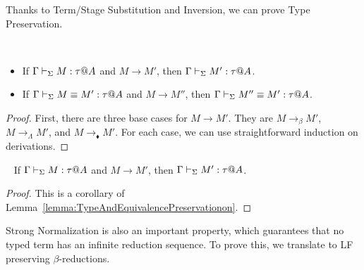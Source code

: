 
Thanks to Term/Stage Substitution and Inversion, we can prove Type
Preservation.

\begin{lemma}\
    \label{lemma:TypeAndEquivalencePreservationon}
    \begin{itemize}
    \item If \( \Gamma \vdash_\Sigma M : \tau @ A \) and \( M \longrightarrow M' \), then \( \Gamma \vdash_\Sigma M' : \tau @ A \).
    \item If \( \Gamma \vdash_\Sigma M \equiv M' : \tau @ A \) and \( M \longrightarrow M'' \), then \( \Gamma \vdash_\Sigma M'' \equiv M' : \tau @ A \).
    \end{itemize}
\end{lemma}

\begin{proof}
    First, there are three base cases for $M \longrightarrow M'$.  They are $M
    \longrightarrow_\beta M'$, $M \longrightarrow_\Lambda M'$, and $M
    \longrightarrow_\blacklozenge M'$.  For each case, we can use
    straightforward induction on derivations.
\end{proof}

\begin{theorem}\
    \label{theorem:TypePreservation}
    If \( \Gamma \vdash_\Sigma M : \tau @ A \) and \( M \longrightarrow M' \), then \( \Gamma \vdash_\Sigma M' : \tau @ A \).
\end{theorem}

\begin{proof} 
    This is a corollary of Lemma~\ref{lemma:TypeAndEquivalencePreservationon}.
\end{proof}


Strong Normalization is also an important property, which guarantees that no
typed term has an infinite reduction sequence. To prove this, we translate \LMD
to LF~\cite{harper1993framework} preserving \( \beta \)-reductions.

